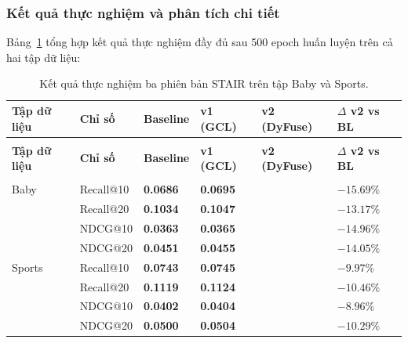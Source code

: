 \begin{longtable}
\subsubsection{Kết quả thực nghiệm và phân tích chi tiết}
 
Bảng~\ref{tab:stair_v2_results} tổng hợp kết quả thực nghiệm đầy đủ sau 500 epoch huấn luyện trên cả hai tập dữ liệu:
 
\renewcommand{\arraystretch}{1.15}
\begin{longtable}{%
    >{\raggedright\arraybackslash}p{2.0cm}
    >{\centering\arraybackslash}p{2.0cm}
    >{\centering\arraybackslash}p{2.3cm}
    >{\centering\arraybackslash}p{2.3cm}
    >{\centering\arraybackslash}p{2.3cm}
    >{\centering\arraybackslash}p{2.3cm}}
 
    \caption{Kết quả thực nghiệm ba phiên bản STAIR trên tập Baby và Sports.}
    \label{tab:stair_v2_results} \\
    \hline
    \rowcolor{gray!15}\textbf{Tập dữ liệu} & \textbf{Chỉ số} & \textbf{Baseline} & \textbf{v1 (GCL)} & \textbf{v2 (DyFuse)} & \textbf{$\Delta$ v2 vs BL} \\
    \hline
    \endfirsthead
    \multicolumn{6}{c}{{\bfseries Bảng \thetable\ (tiếp theo)}} \\
    \hline
    \rowcolor{gray!15}\textbf{Tập dữ liệu} & \textbf{Chỉ số} & \textbf{Baseline} & \textbf{v1 (GCL)} & \textbf{v2 (DyFuse)} & \textbf{$\Delta$ v2 vs BL} \\
    \hline
    \endhead
    \midrule
    \multicolumn{6}{r}{\textit{Tiếp tục ở trang sau...}} \\
    \endfoot
    \hline
    \endlastfoot
 
    Baby & Recall@10 & \textbf{0.0686} & \textbf{0.0695} & 0.0578 & $-15.69\%$ \\
    \midrule
    & Recall@20 & \textbf{0.1034} & \textbf{0.1047} & 0.0898 & $-13.17\%$ \\
    \midrule
    & NDCG@10   & \textbf{0.0363} & \textbf{0.0365} & 0.0309 & $-14.96\%$ \\
    \midrule
    & NDCG@20   & \textbf{0.0451} & \textbf{0.0455} & 0.0388 & $-14.05\%$ \\
    \hline
    Sports & Recall@10 & \textbf{0.0743} & \textbf{0.0745} & 0.0669 & $-9.97\%$  \\
    \midrule
    & Recall@20 & \textbf{0.1119} & \textbf{0.1124} & 0.1002 & $-10.46\%$ \\
    \midrule
    & NDCG@10   & \textbf{0.0402} & \textbf{0.0404} & 0.0366 & $-8.96\%$  \\
    \midrule
    & NDCG@20   & \textbf{0.0500} & \textbf{0.0504} & 0.0449 & $-10.29\%$ \\
    \hline
\end{longtable}


\end{longtable}
